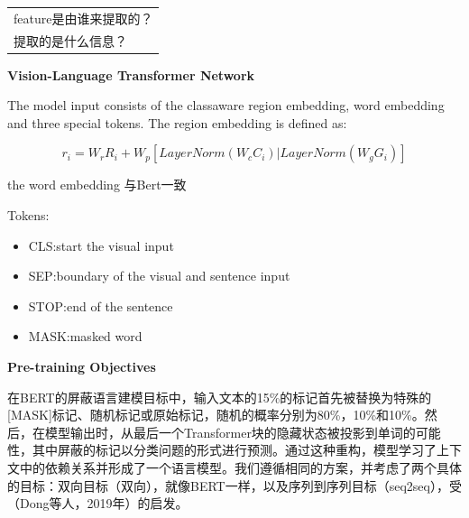 \documentclass{article}
\begin{document}
\begin{sloppypar}
\begin{table}[!htbp]
            \centering
            \begin{tabularx}{\textwidth}{|X|}
                  \hline
                  feature是由谁来提取的？ \\
                  提取的是什么信息？
                  \\
                  \hline
            \end{tabularx}%

      \end{table}%
      \centerline{\textbf{Vision-Language Transformer Network}}

      The model input consists of the classaware region embedding, word embedding and three special tokens. The region embedding is defined as:

      \begin{equation}
            r_i=W_rR_i+W_p[LayerNorm(W_cC_i)|LayerNorm(W_gG_i)]
            \label{ri}
      \end{equation}


      the word embedding 与Bert一致

      Tokens:


      \begin{itemize}
            \item CLS:start the  visual input
            \item SEP:boundary of the visual and sentence input
            \item STOP:end of the sentence
            \item MASK:masked word
      \end{itemize}


      \centerline{\textbf{Pre-training Objectives}}
      在BERT的屏蔽语言建模目标中，输入文本的15\%的标记首先被替换为特殊的[MASK]标记、随机标记或原始标记，随机的概率分别为80\%，10\%和10\%。然后，在模型输出时，从最后一个Transformer块的隐藏状态被投影到单词的可能性，其中屏蔽的标记以分类问题的形式进行预测。通过这种重构，模型学习了上下文中的依赖关系并形成了一个语言模型。我们遵循相同的方案，并考虑了两个具体的目标：双向目标（双向），就像BERT一样，以及序列到序列目标（seq2seq），受（Dong等人，2019年）的启发。


\end{sloppypar}
\end{document}
